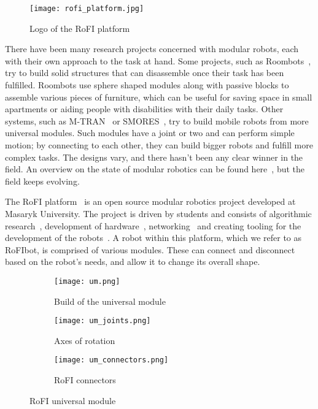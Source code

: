 \begin{figure}
    \centering
    \texttt{[image: rofi\_platform.jpg]}
  \caption{Logo of the RoFI platform~\cite{rofiPlatform}}
\end{figure}

There have been many research projects concerned with modular robots, each with their own approach to the task at hand. Some projects, such as Roombots~\cite{sprowitz_roombots_2010}, try to build solid structures that can disassemble once their task has been fulfilled. Roombots use sphere shaped modules along with passive blocks to assemble various pieces of furniture, which can be useful for saving space in small apartments or aiding people with disabilities with their daily tasks. Other systems, such as M-TRAN~\cite{mtran} or SMORES~\cite{smores}, try to build mobile robots from more universal modules. Such modules have a joint or two and can perform simple motion; by connecting to each other, they can build bigger robots and fulfill more complex tasks. The designs vary, and there hasn't been any clear winner in the field. An overview on the state of modular robotics can be found here~\cite{modular_survey}, but the field keeps evolving.

The RoFI platform~\cite{Mrázek2019thesis} is an open source modular robotics project developed at Masaryk University. The project is driven by students and consists of algorithmic research~\cite{Vozárová2019thesis, Zacek2021thesis, Nausova2022thesis, Ondika2021thesis, SMTReconfig}, development of hardware~\cite{Mrázek2019thesis, RoFICoM}, networking~\cite{Chlup2020thesis, Chlup2023thesis} and creating tooling for the development of the robots~\cite{Naušová2019thesis, Svoboda2020thesis}.
A robot within this platform, which we refer to as RoFIbot, is comprised of various modules. These can connect and disconnect based on the robot's needs, and allow it to change its overall shape.

\begin{figure}
  \centering
  \begin{subfigure}[t]{0.32\textwidth}
  \centering
    \texttt{[image: um.png]}
    \caption{Build of the universal module~\cite{rofiUm}}\label{fig:um}
  \end{subfigure}
  \begin{subfigure}[t]{0.32\textwidth}
  \centering
    \texttt{[image: um\_joints.png]}
    \caption{Axes of rotation~\cite{rofiUm}}\label{fig:um_joints}
  \end{subfigure}
  \begin{subfigure}[t]{0.32\textwidth}
  \centering
    \texttt{[image: um\_connectors.png]}
    \caption{RoFI connectors~\cite{rofiUm}}\label{fig:um_conn}
  \end{subfigure}
  \caption{RoFI universal module}
\end{figure}

